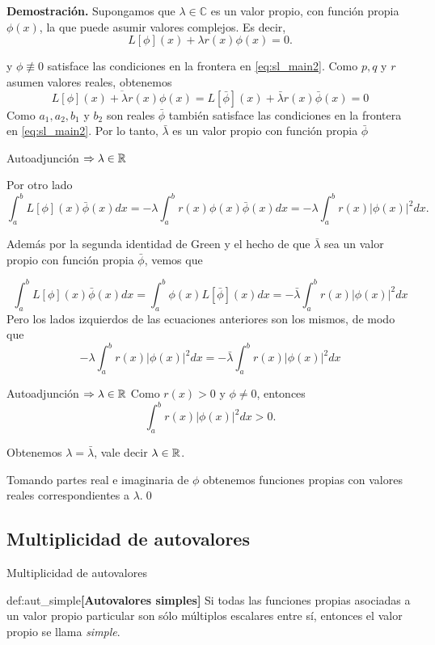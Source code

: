 \textbf{Demostración.} Supongamos que $\lambda\in \mathbb{C}$ es un valor propio, con función propia $\phi(x)$, la que puede asumir valores complejos. Es decir,
$$L[\phi](x)+\lambda r(x) \phi(x)=0.$$

y $\phi\not\equiv 0$ satisface las condiciones en la frontera en  \eqref{eq:sl_main2}. Como $p, q$ y $r$ asumen valores reales, obtenemos
$$\overline{L[\phi](x)+\lambda r(x) \phi(x)}=L[\bar{\phi}](x)+\bar{\lambda} r(x) \bar{\phi}(x)=0$$
Como $a_{1}, a_{2}, b_{1}$ y $b_{2}$ son reales $\bar{\phi}$ también satisface las condiciones en la frontera en \eqref{eq:sl_main2}. Por lo tanto, $\bar{\lambda}$ es un valor propio con función propia $\bar{\phi}$




{Autoadjunción $\Rightarrow \lambda\in\mathbb{R}$}

Por otro lado
$$\int_{a}^{b} L[\phi](x) \bar{\phi}(x) d x=-\lambda \int_{a}^{b} r(x) \phi(x) \bar{\phi}(x) d x=-\lambda \int_{a}^{b} r(x)|\phi(x)|^{2} d x.$$


Además por la segunda identidad de Green y el hecho de que $\bar{\lambda}$ sea un valor propio con función propia $\bar{\phi}$, vemos que


$$
\int_{a}^{b} L[\phi](x) \bar{\phi}(x) d x=\int_{a}^{b} \phi(x) L[\bar{\phi}](x) d x=-\bar{\lambda} \int_{a}^{b} r(x)|\phi(x)|^{2} d x
$$
Pero los lados izquierdos de las ecuaciones anteriores son los mismos, de modo que 
$$
-\lambda \int_{a}^{b} r(x)|\phi(x)|^{2} d x=-\bar{\lambda} \int_{a}^{b} r(x)|\phi(x)|^{2} d x
$$




{Autoadjunción $\Rightarrow \lambda\in\mathbb{R}$}
Como $r(x)>0$ y $\phi\neq 0$, entonces 
$$\int_{a}^{b} r(x)|\phi(x)|^{2} d x>0.$$ 

Obtenemos $\lambda=\bar{\lambda}$, vale decir $\lambda\in\mathbb{R}$. 

Tomando partes real e imaginaria de  $\phi$ obtenemos  funciones propias con valores reales correspondientes a $\lambda$.\qed 


\subsection{Multiplicidad de autovalores}

{Multiplicidad de autovalores}


\begin{definicion}{def:aut_simple}{\textbf{[Autovalores simples]}} Si todas las funciones propias asociadas a un valor propio particular son sólo múltiplos escalares entre sí, entonces el valor propio se llama \emph{simple}.
\end{definicion}


